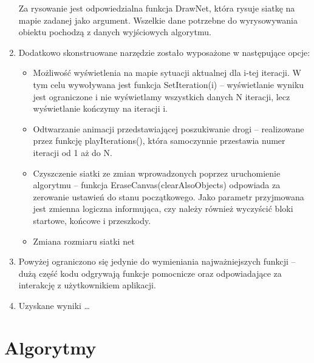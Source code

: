 \documentclass{article}
\begin{document}
\begin{enumerate}
Za rysowanie jest odpowiedzialna funkcja DrawNet, która rysuje siatkę na mapie zadanej jako argument. Wszelkie dane potrzebne do wyrysowywania obiektu pochodzą z danych wyjściowych algorytmu. 
	\item Dodatkowo skonstruowane narzędzie zostało wyposażone w następujące opcje:
	\begin{itemize}
			\item Możliwość wyświetlenia na mapie sytuacji aktualnej dla i-tej iteracji. W tym celu wywoływana jest funkcja SetIteration(i) – wyświetlanie wyniku jest ograniczone i nie wyświetlamy wszystkich danych N iteracji, lecz wyświetlanie kończymy na iteracji i.
   			\item Odtwarzanie animacji przedstawiającej poszukiwanie drogi – realizowane przez funkcję playIterations(), która samoczynnie przestawia numer iteracji od 1 aż do N.
			\item Czyszczenie siatki ze zmian wprowadzonych poprzez uruchomienie algorytmu – funkcja EraseCanvas(clearAlsoObjects) odpowiada za zerowanie ustawień do stanu początkowego. Jako parametr przyjmowana jest zmienna logiczna informująca, czy należy również wyczyścić bloki startowe, końcowe i przeszkody. 
			\item Zmiana rozmiaru siatki net
	\end{itemize}
	\item Powyżej ograniczono się jedynie do wymieniania najważniejszych funkcji – dużą część kodu odgrywają funkcje pomocnicze oraz odpowiadające za interakcję z użytkownikiem aplikacji. 
	\item Uzyskane wyniki …
\end{enumerate}


\newpage


\section{Algorytmy}
\end{document}

